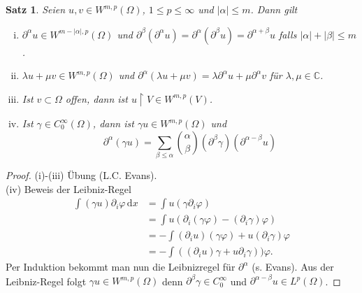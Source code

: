 \documentclass[
paper=a4,
bibtotocnumbered,
liststotocnumbered,
tablecaptionabove,
pointlessnumbers,
twoside,
openright,
10pt
]
{report}
\let\phi\varphi
\newtheorem{satz}[thm]{Satz}
\theoremstyle{definition}
\numberwithin{equation}{chapter}
\begin{document}
\begin{satz}
Seien $u,v\in W^{m,p}(\Omega)$, $1\le p \le \infty$ und $|\alpha |\le m$. Dann gilt
\begin{enumerate}[i)]
\item $\partial^\alpha u\in W^{m-|\alpha|, p}(\Omega)$ und $\partial^\beta(\partial^\alpha u) = \partial^\alpha (\partial^\beta u) = \partial^{\alpha + \beta} u$ falls $|\alpha|+|\beta|\le m$.
\item $\lambda u + \mu v\in W^{m,p}(\Omega)$ und $\partial^\alpha (\lambda u + \mu v)= \lambda \partial^\alpha u + \mu \partial^\alpha v$ für $\lambda, \mu \in \mathbb C$.
\item Ist $v\subset \Omega$ offen, dann ist $u\upharpoonright V\in W^{m,p}(V)$. 
\item Ist $\gamma \in C_0^\infty(\Omega)$, dann ist $\gamma u \in W^{m,p}(\Omega)$ und
$$
\partial^\alpha (\gamma u) = \sum_{\beta \le \alpha} \binom{\alpha}{\beta} (\partial^\beta \gamma) ( \partial^{\alpha-\beta}u)
$$ 
\end{enumerate}
\end{satz}
\begin{proof}
(i)-(iii) Übung (L.C. Evans).\\
(iv) Beweis der  Leibniz-Regel
\begin{align*}
\int(\gamma u) \partial_i \phi \, \mathrm dx &= \int u (\gamma \partial_i \phi) \\
&= \int u (\partial_i (\gamma \phi) - (\partial_i \gamma) \phi) \\
&= - \int (\partial_i u) (\gamma \phi) + u(\partial_i \gamma) \phi \\
&= - \int ((\partial_i u) \gamma + u\partial_i \gamma)) \phi.
\end{align*}
Per Induktion bekommt man nun die Leibnizregel für $\partial^\alpha$ (s. Evans).
Aus der Leibniz-Regel folgt $\gamma u \in W^{m,p}(\Omega)$ denn $\partial^\beta \gamma\in C_0^\infty$ und $\partial^{\alpha-\beta}u \in L^p(\Omega)$.
\end{proof}
\end{document}
